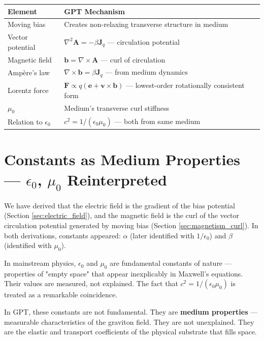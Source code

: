 \documentclass[12pt, a4paper]{article}
\begin{document}
\begin{center}
\begin{tabular}{|p{4cm}|p{10cm}|}
\hline
\textbf{Element} & \textbf{GPT Mechanism} \\
\hline
Moving bias & Creates non-relaxing transverse structure in medium \\
\hline
Vector potential & \( \nabla^2 \mathbf{A} = -\beta \mathbf{J}_q \) — circulation potential \\
\hline
Magnetic field & \( \mathbf{b} = \nabla \times \mathbf{A} \) — curl of circulation \\
\hline
Ampère's law & \( \nabla \times \mathbf{b} = \beta \mathbf{J}_q \) — from medium dynamics \\
\hline
Lorentz force & \( \mathbf{F} \propto q(\mathbf{e} + \mathbf{v} \times \mathbf{b}) \) — lowest-order rotationally consistent form \\
\hline
\( \mu_0 \) & Medium's transverse curl stiffness \\
\hline
Relation to \( \epsilon_0 \) & \( c^2 = 1/(\epsilon_0 \mu_0) \) — both from same medium \\
\hline
\end{tabular}
\end{center}

\section{Constants as Medium Properties — \( \epsilon_0 \), \( \mu_0 \) Reinterpreted}
\label{sec:constants_medium}

We have derived that the electric field is the gradient of the bias potential (Section \ref{sec:electric_field}), and the magnetic field is the curl of the vector circulation potential generated by moving bias (Section \ref{sec:magnetism_curl}). In both derivations, constants appeared: \( \alpha \) (later identified with \( 1/\epsilon_0 \)) and \( \beta \) (identified with \( \mu_0 \)).

In mainstream physics, \( \epsilon_0 \) and \( \mu_0 \) are fundamental constants of nature — properties of "empty space" that appear inexplicably in Maxwell's equations. Their values are measured, not explained. The fact that \( c^2 = 1/(\epsilon_0 \mu_0) \) is treated as a remarkable coincidence.

In GPT, these constants are not fundamental. They are \textbf{medium properties} — measurable characteristics of the graviton field. They are not unexplained. They are the elastic and transport coefficients of the physical substrate that fills space.
\end{document}
